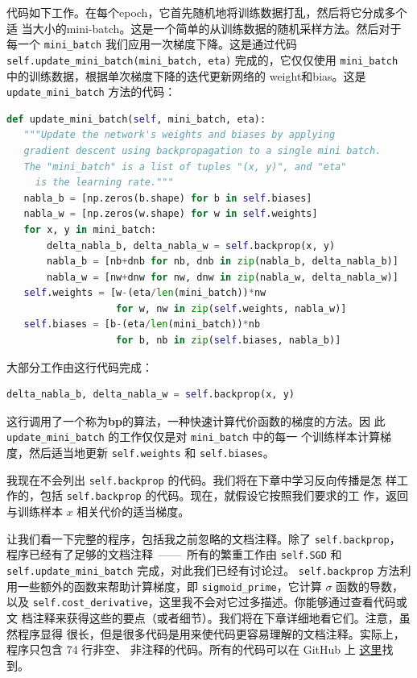 代码如下工作。在每个\gls*{epoch}，它首先随机地将训练数据打乱，然后将它分成多个适
当大小的\gls*{mini-batch}{}。这是一个简单的从训练数据的随机采样方法。然后对于每一个
\lstinline!mini_batch! 我们应用一次梯度下降。这是通过代码
\lstinline!self.update_mini_batch(mini_batch, eta)! 完成的，它仅仅使用
\lstinline!mini_batch! 中的训练数据，根据单次梯度下降的迭代更新网络的%
\gls*{weight}和\gls*{bias}。这是 \lstinline!update_mini_batch! 方法的代码：
\begin{lstlisting}[language=Python]
def update_mini_batch(self, mini_batch, eta):
   """Update the network's weights and biases by applying
   gradient descent using backpropagation to a single mini batch.
   The "mini_batch" is a list of tuples "(x, y)", and "eta"
     is the learning rate."""
   nabla_b = [np.zeros(b.shape) for b in self.biases]
   nabla_w = [np.zeros(w.shape) for w in self.weights]
   for x, y in mini_batch:
       delta_nabla_b, delta_nabla_w = self.backprop(x, y)
       nabla_b = [nb+dnb for nb, dnb in zip(nabla_b, delta_nabla_b)]
       nabla_w = [nw+dnw for nw, dnw in zip(nabla_w, delta_nabla_w)]
   self.weights = [w-(eta/len(mini_batch))*nw
                   for w, nw in zip(self.weights, nabla_w)]
   self.biases = [b-(eta/len(mini_batch))*nb
                   for b, nb in zip(self.biases, nabla_b)]
\end{lstlisting}

大部分工作由这行代码完成：
\begin{lstlisting}[language=Python]
     delta_nabla_b, delta_nabla_w = self.backprop(x, y)
\end{lstlisting}

这行调用了一个称为\textbf{\gls{bp}}的算法，一种快速计算代价函数的梯度的方法。因
此 \lstinline!update_mini_batch! 的工作仅仅是对 \lstinline!mini_batch! 中的每一
个训练样本计算梯度，然后适当地更新 \lstinline!self.weights! 和
\lstinline!self.biases!。

我现在不会列出 \lstinline!self.backprop! 的代码。我们将在下章中学习反向传播是怎
样工作的，包括 \lstinline!self.backprop! 的代码。现在，就假设它按照我们要求的工
作，返回与训练样本 $x$ 相关代价的适当梯度。

让我们看一下完整的程序，包括我之前忽略的文档注释。除了 \lstinline!self.backprop!，
程序已经有了足够的文档注释~——~所有的繁重工作由 \lstinline!self.SGD! 和
\lstinline!self.update_mini_batch! 完成，对此我们已经有讨论过。
\lstinline!self.backprop! 方法利用一些额外的函数来帮助计算梯度，即
\lstinline!sigmoid_prime!，它计算 $\sigma$ 函数的导数，以及
\lstinline!self.cost_derivative!，这里我不会对它过多描述。你能够通过查看代码或文
档注释来获得这些的要点（或者细节）。我们将在下章详细地看它们。注意，虽然程序显得
很长，但是很多代码是用来使代码更容易理解的文档注释。实际上，程序只包含 74 行非空、
非注释的代码。所有的代码可以在 GitHub 上%
\href{https://github.com/mnielsen/neural-networks-and-deep-learning/blob/master/src/network.py}{
  这里}找到。

